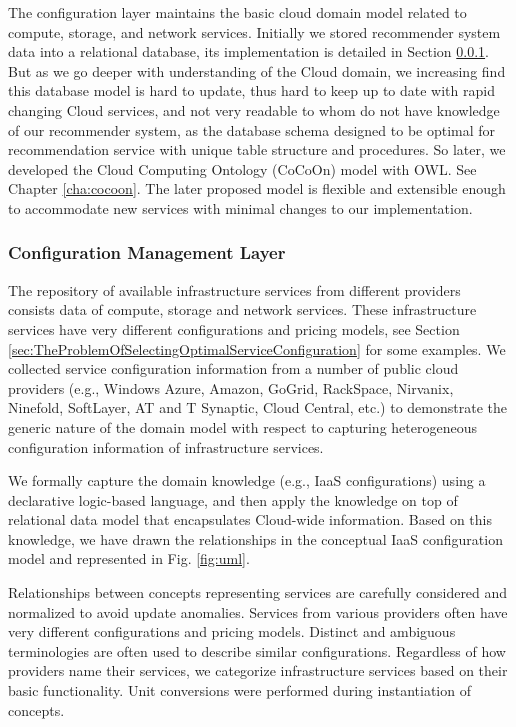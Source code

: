 The configuration layer maintains the basic cloud domain model related to compute, storage, and network services.
Initially we stored recommender system data into a relational database,
its implementation is detailed in Section \ref{sec:InfrastructureServiceConfigurationRepository}.
But as we go deeper with understanding of the Cloud domain,
we increasing find this database model is hard to update,
thus hard to keep up to date with rapid changing Cloud services,
and not very readable to whom do not have knowledge of our recommender system,
as the database schema designed to be optimal for recommendation service with unique table structure and procedures.
So later, we developed the Cloud Computing Ontology (CoCoOn) model with OWL.
See Chapter \ref{cha:cocoon}.
The later proposed model is flexible and extensible enough to accommodate new services with minimal changes to our implementation. 

\subsubsection{Configuration Management Layer}
\label{sec:InfrastructureServiceConfigurationRepository}
The repository of available infrastructure services from different
providers consists data of compute, storage and network services.
These infrastructure services have very different configurations and pricing models, see Section \ref{sec:TheProblemOfSelectingOptimalServiceConfiguration} for some examples.
We collected service configuration information from a
number of public cloud providers (e.g., Windows Azure, Amazon, GoGrid,
RackSpace, Nirvanix, Ninefold, SoftLayer, AT and T Synaptic, Cloud Central, etc.) to demonstrate the generic nature of the domain model with respect to capturing heterogeneous configuration information of infrastructure services. 

We formally capture the domain knowledge (e.g., IaaS configurations)
using a declarative logic-based language, and then apply the
knowledge on top of relational data model that encapsulates
Cloud-wide information. Based on this knowledge, we have
drawn the relationships in the conceptual IaaS configuration
model and represented in Fig. \ref{fig:uml}.

Relationships between concepts representing services are carefully considered and normalized to avoid update anomalies. Services from various providers often have very different configurations and pricing models. Distinct and ambiguous
terminologies are often used to describe similar configurations.
Regardless of how providers name their services, we categorize infrastructure services based on their basic functionality.
Unit conversions were performed during instantiation of concepts.

